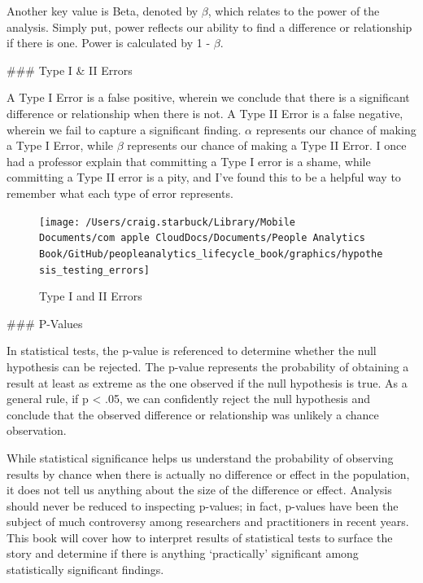 \documentclass[]{book}
\begin{document}
Another key value is Beta, denoted by \(\beta\), which relates to the power of the analysis. Simply put, power reflects our ability to find a difference or relationship if there is one. Power is calculated by 1 - \(\beta\).

\#\#\# Type I \& II Errors

A Type I Error is a false positive, wherein we conclude that there is a significant difference or relationship when there is not. A Type II Error is a false negative, wherein we fail to capture a significant finding. \(\alpha\) represents our chance of making a Type I Error, while \(\beta\) represents our chance of making a Type II Error. I once had a professor explain that committing a Type I error is a shame, while committing a Type II error is a pity, and I've found this to be a helpful way to remember what each type of error represents.

\begin{figure}

{\centering \texttt{[image: /Users/craig.starbuck/Library/Mobile Documents/com~apple~CloudDocs/Documents/People Analytics Book/GitHub/peopleanalytics\_lifecycle\_book/graphics/hypothesis\_testing\_errors]} 

}

\caption{Type I and II Errors}\label{fig:unnamed-chunk-22}
\end{figure}

\#\#\# P-Values

In statistical tests, the p-value is referenced to determine whether the null hypothesis can be rejected. The p-value represents the probability of obtaining a result at least as extreme as the one observed if the null hypothesis is true. As a general rule, if p \textless{} .05, we can confidently reject the null hypothesis and conclude that the observed difference or relationship was unlikely a chance observation.

While statistical significance helps us understand the probability of observing results by chance when there is actually no difference or effect in the population, it does not tell us anything about the size of the difference or effect. Analysis should never be reduced to inspecting p-values; in fact, p-values have been the subject of much controversy among researchers and practitioners in recent years. This book will cover how to interpret results of statistical tests to surface the story and determine if there is anything `practically' significant among statistically significant findings.
\end{document}
